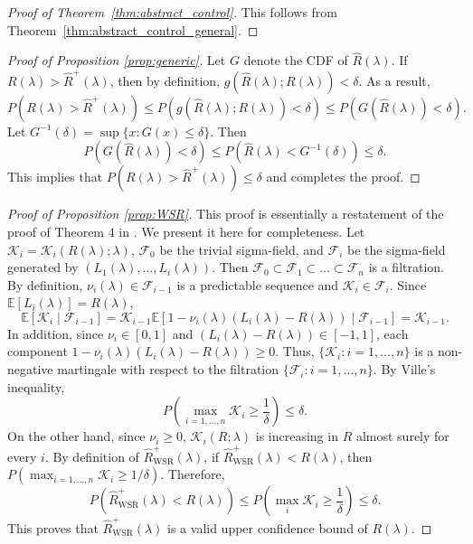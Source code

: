 \documentclass[10pt]{article}
\def\E{\mathbb{E}}
\newcommand{\Rhat}{\widehat{R}}
\begin{document}
\begin{proof}[Proof of Theorem~\ref{thm:abstract_control}]
This follows from Theorem~\ref{thm:abstract_control_general}.
\end{proof}

\begin{proof}[Proof of Proposition \ref{prop:generic}]
Let $G$ denote the CDF of $\Rhat(\lambda)$. If $R(\lambda) > \Rhat^+(\lambda)$, then by definition, $g(\Rhat(\lambda); R(\lambda)) < \delta$. As a result, 
$$
P(R(\lambda) > \Rhat^+(\lambda))\le P(g(\Rhat(\lambda); R(\lambda)) < \delta) \le P(G(\Rhat(\lambda)) < \delta).
$$
Let $G^{-1}(\delta) = \sup\{x: G(x)\le \delta\}$. Then  $$
P(G(\Rhat(\lambda)) < \delta) \le P(\Rhat(\lambda) < G^{-1}(\delta)) \le \delta.
$$
This implies that $P(R(\lambda) > \Rhat^+(\lambda))\le \delta$ and completes the proof.
\end{proof}

\begin{proof}[Proof of Proposition \ref{prop:WSR}]
This proof is essentially a restatement of the proof of Theorem 4 in \cite{waudby2020variance}. We present it here for completeness. Let $\mathcal{K}_i = \mathcal{K}_i(R(\lambda); \lambda)$, $\mathcal{F}_0$ be the trivial sigma-field, and $\mathcal{F}_i$ be the sigma-field generated by $(L_1(\lambda), \ldots, L_i(\lambda))$. Then $\mathcal{F}_0\subset \mathcal{F}_1 \subset \ldots \subset \mathcal{F}_n$ is a filtration. By definition, $\nu_i(\lambda)\in \mathcal{F}_{i-1}$ is a predictable sequence and $\mathcal{K}_i\in \mathcal{F}_i$. Since $\E[L_i(\lambda)] = R(\lambda)$, 
$$
\E[\mathcal{K}_i\mid \mathcal{F}_{i-1}] = \mathcal{K}_{i-1} \E[1 - \nu_i(\lambda)(L_i(\lambda) - R(\lambda))\mid \mathcal{F}_{i-1}] = \mathcal{K}_{i-1}.
$$
In addition, since $\nu_i\in [0, 1]$ and $(L_i(\lambda) - R(\lambda))\in [-1, 1]$, each component $1 - \nu_i(\lambda)(L_i(\lambda) - R(\lambda))\ge 0$. Thus, $\{\mathcal{K}_i: i = 1,\ldots, n\}$ is a non-negative martingale with respect to the filtration $\{\mathcal{F}_i: i = 1, \ldots, n\}$. By Ville's inequality,
$$
P\left(\max_{i = 1, \ldots, n}\mathcal{K}_i \ge \frac{1}{\delta}\right)\le \delta.
$$
On the other hand, since $\nu_i\ge 0$, $\mathcal{K}_i(R; \lambda)$ is increasing in $R$ almost surely for every $i$. By definition of $\Rhat_{\mathrm{WSR}}^+(\lambda)$, if $\Rhat_{\mathrm{WSR}}^+(\lambda) < R(\lambda)$, then $P(\max_{i = 1,\ldots,n}\mathcal{K}_i \ge 1 / \delta)$. Therefore,
$$
P\left(\Rhat_{\mathrm{WSR}}^+(\lambda) < R(\lambda)\right) \le P\left(\max_{i}\mathcal{K}_i \ge \frac{1}{\delta}\right)\le \delta.
$$
This proves that $\Rhat_{\mathrm{WSR}}^+(\lambda)$ is a valid upper confidence bound of $R(\lambda)$.
\end{proof}
\end{document}
